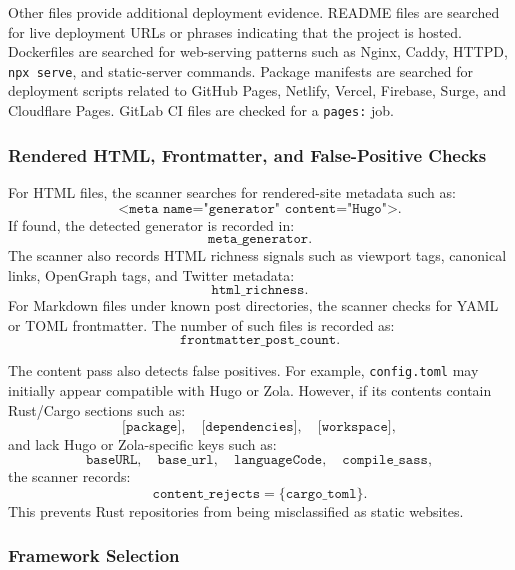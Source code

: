 Other files provide additional deployment evidence. README files are searched for live deployment URLs or phrases indicating that the project is hosted. Dockerfiles are searched for web-serving patterns such as Nginx, Caddy, HTTPD, \texttt{npx serve}, and static-server commands. Package manifests are searched for deployment scripts related to GitHub Pages, Netlify, Vercel, Firebase, Surge, and Cloudflare Pages. GitLab CI files are checked for a \texttt{pages:} job.

\subsubsection{Rendered HTML, Frontmatter, and False-Positive Checks}

For HTML files, the scanner searches for rendered-site metadata such as:
\[
\texttt{<meta name="generator" content="Hugo">}.
\]
If found, the detected generator is recorded in:
\[
\texttt{meta\_generator}.
\]
The scanner also records HTML richness signals such as viewport tags, canonical links, OpenGraph tags, and Twitter metadata:
\[
\texttt{html\_richness}.
\]
For Markdown files under known post directories, the scanner checks for YAML or TOML frontmatter. The number of such files is recorded as:
\[
\texttt{frontmatter\_post\_count}.
\]

The content pass also detects false positives. For example, \texttt{config.toml} may initially appear compatible with Hugo or Zola. However, if its contents contain Rust/Cargo sections such as:
\[
\texttt{[package]},\quad \texttt{[dependencies]},\quad \texttt{[workspace]},
\]
and lack Hugo or Zola-specific keys such as:
\[
\texttt{baseURL},\quad \texttt{base\_url},\quad \texttt{languageCode},\quad \texttt{compile\_sass},
\]
the scanner records:
\[
\texttt{content\_rejects} = \{\texttt{cargo\_toml}\}.
\]
This prevents Rust repositories from being misclassified as static websites.

\subsubsection{Framework Selection}

